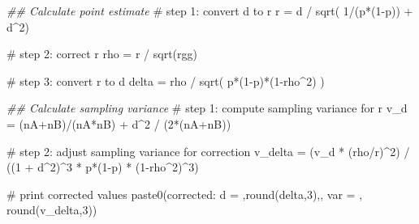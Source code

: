 \documentclass[
  letterpaper,
  DIV=11,
  numbers=noendperiod]{scrreprt}
\newenvironment{Shaded}{\begin{snugshade}}{\end{snugshade}}
\newcommand{\CommentTok}[1]{\textcolor[rgb]{0.37,0.37,0.37}{#1}}
\newcommand{\DecValTok}[1]{\textcolor[rgb]{0.68,0.00,0.00}{#1}}
\newcommand{\DocumentationTok}[1]{\textcolor[rgb]{0.37,0.37,0.37}{\textit{#1}}}
\newcommand{\FunctionTok}[1]{\textcolor[rgb]{0.28,0.35,0.67}{#1}}
\newcommand{\NormalTok}[1]{\textcolor[rgb]{0.00,0.23,0.31}{#1}}
\newcommand{\OtherTok}[1]{\textcolor[rgb]{0.00,0.23,0.31}{#1}}
\newcommand{\SpecialCharTok}[1]{\textcolor[rgb]{0.37,0.37,0.37}{#1}}
\newcommand{\StringTok}[1]{\textcolor[rgb]{0.13,0.47,0.30}{#1}}
\begin{document}
\begin{Shaded}
\begin{Highlighting}[]
\DocumentationTok{\#\# Calculate point estimate}
\CommentTok{\# step 1: convert d to r}
\NormalTok{r }\OtherTok{=}\NormalTok{ d }\SpecialCharTok{/} \FunctionTok{sqrt}\NormalTok{( }\DecValTok{1}\SpecialCharTok{/}\NormalTok{(p}\SpecialCharTok{*}\NormalTok{(}\DecValTok{1}\SpecialCharTok{{-}}\NormalTok{p)) }\SpecialCharTok{+}\NormalTok{ d}\SpecialCharTok{\^{}}\DecValTok{2}\NormalTok{)}

\CommentTok{\# step 2: correct r}
\NormalTok{rho }\OtherTok{=}\NormalTok{ r }\SpecialCharTok{/} \FunctionTok{sqrt}\NormalTok{(rgg)}

\CommentTok{\# step 3: convert r to d}
\NormalTok{delta }\OtherTok{=}\NormalTok{ rho }\SpecialCharTok{/} \FunctionTok{sqrt}\NormalTok{( p}\SpecialCharTok{*}\NormalTok{(}\DecValTok{1}\SpecialCharTok{{-}}\NormalTok{p)}\SpecialCharTok{*}\NormalTok{(}\DecValTok{1}\SpecialCharTok{{-}}\NormalTok{rho}\SpecialCharTok{\^{}}\DecValTok{2}\NormalTok{) )}

\DocumentationTok{\#\# Calculate sampling variance}
\CommentTok{\# step 1: compute sampling variance for r}
\NormalTok{v\_d }\OtherTok{=}\NormalTok{ (nA}\SpecialCharTok{+}\NormalTok{nB)}\SpecialCharTok{/}\NormalTok{(nA}\SpecialCharTok{*}\NormalTok{nB) }\SpecialCharTok{+}\NormalTok{ d}\SpecialCharTok{\^{}}\DecValTok{2} \SpecialCharTok{/}\NormalTok{ (}\DecValTok{2}\SpecialCharTok{*}\NormalTok{(nA}\SpecialCharTok{+}\NormalTok{nB))}

\CommentTok{\# step 2: adjust sampling variance for correction}
\NormalTok{v\_delta }\OtherTok{=}\NormalTok{ (v\_d }\SpecialCharTok{*}\NormalTok{ (rho}\SpecialCharTok{/}\NormalTok{r)}\SpecialCharTok{\^{}}\DecValTok{2}\NormalTok{) }\SpecialCharTok{/}\NormalTok{ ((}\DecValTok{1} \SpecialCharTok{+}\NormalTok{ d}\SpecialCharTok{\^{}}\DecValTok{2}\NormalTok{)}\SpecialCharTok{\^{}}\DecValTok{3} \SpecialCharTok{*}\NormalTok{ p}\SpecialCharTok{*}\NormalTok{(}\DecValTok{1}\SpecialCharTok{{-}}\NormalTok{p) }\SpecialCharTok{*}\NormalTok{ (}\DecValTok{1}\SpecialCharTok{{-}}\NormalTok{rho}\SpecialCharTok{\^{}}\DecValTok{2}\NormalTok{)}\SpecialCharTok{\^{}}\DecValTok{3}\NormalTok{)}

\CommentTok{\# print corrected values}
\FunctionTok{paste0}\NormalTok{(}\StringTok{\textquotesingle{}corrected: d = \textquotesingle{}}\NormalTok{,}\FunctionTok{round}\NormalTok{(delta,}\DecValTok{3}\NormalTok{),}\StringTok{\textquotesingle{},  var = \textquotesingle{}}\NormalTok{, }\FunctionTok{round}\NormalTok{(v\_delta,}\DecValTok{3}\NormalTok{))}
\end{Highlighting}
\end{Shaded}
\end{document}
